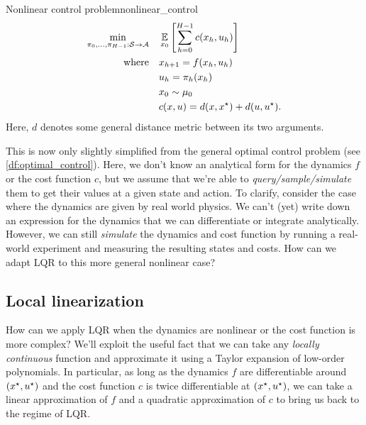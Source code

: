 \documentclass[../main/main]{subfiles}
\begin{document}
\begin{definition}{Nonlinear control problem}{nonlinear_control}
\begin{align*}
    \min_{\pi_0, \dots, \pi_{H-1} : \mathcal{S} \to \mathcal{A}} \quad & \operatorname*{\mathbb{E}}_{x_0} \left[ \sum_{h=0}^{H-1} c(x_h, u_h) \right] \\
    \text{where} \quad & x_{h+1} = f(x_h, u_h) \\
    & u_h = \pi_h(x_h) \\
    & x_0 \sim \mu_0 \\
    & c(x, u) = d(x, x^\star) + d(u, u^\star).
\end{align*}
Here, $d$ denotes some general distance metric between its two arguments.
\end{definition}

This is now only slightly simplified from the general optimal control problem (see \ref{df:optimal_control}). Here, we don't know an analytical form for the dynamics $f$ or the cost function $c$,
but we assume that we're able to \emph{query/sample/simulate} them to get their values at a given state and action.
To clarify, consider the case where the dynamics are given by real world physics.
We can't (yet) write down an expression for the dynamics that we can differentiate or integrate analytically.
However, we can still \emph{simulate} the dynamics and cost function by running a real-world experiment and measuring the resulting states and costs.
How can we adapt LQR to this more general nonlinear case?

\subsection{Local linearization}

How can we apply LQR when the dynamics are nonlinear or the cost function is more complex?
We'll exploit the useful fact that we can take any \emph{locally continuous} function and approximate it using a Taylor expansion of low-order polynomials.
In particular, as long as the dynamics $f$ are differentiable around $(x^\star, u^\star)$ and the cost function $c$ is twice differentiable at $(x^\star, u^\star)$, we can take a linear approximation of $f$ and a quadratic approximation of $c$ to bring us back to the regime of LQR.
\end{document}
